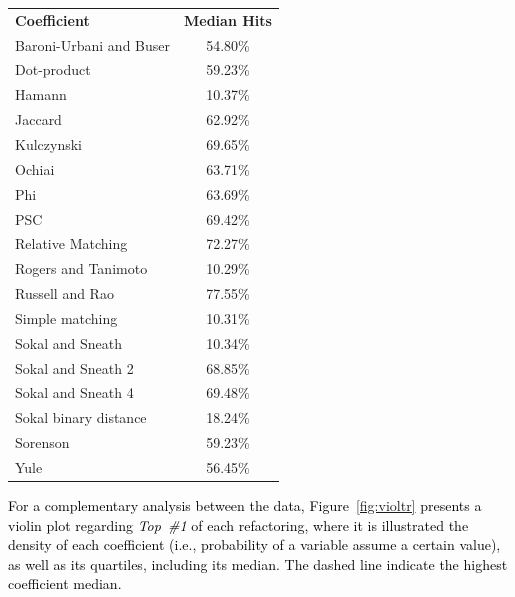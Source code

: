 \documentclass[smallextended,natbib]{svjour3}
\begin{document}
{\begin{table}[tbp]
\begin{tabular}{lccc}
    \hline
    \rowcolor{gray!25} \textbf{Coefficient}  & \multicolumn{3}{c}{\textbf{Median Hits}} \\
    Baroni-Urbani and Buser & \multicolumn{3}{c}{54.80\%} \\[-0.0110cm]
    \rowcolor{gray!15}Dot-product & \multicolumn{3}{c}{59.23\%} \\[-0.0110cm]
    Hamann & \multicolumn{3}{c}{10.37\%} \\[-0.0110cm]
    \rowcolor{gray!15}Jaccard & \multicolumn{3}{c}{62.92\%} \\[-0.0110cm]
    Kulczynski & \multicolumn{3}{c}{69.65\%} \\[-0.0110cm]
    \rowcolor{gray!15}Ochiai & \multicolumn{3}{c}{63.71\%} \\[-0.0110cm]
    Phi & \multicolumn{3}{c}{63.69\%} \\[-0.0110cm]
    \rowcolor{gray!15}PSC & \multicolumn{3}{c}{69.42\%} \\[-0.0110cm]
    Relative Matching & \multicolumn{3}{c}{72.27\%} \\[-0.0110cm]
    \rowcolor{gray!15}Rogers and Tanimoto & \multicolumn{3}{c}{10.29\%} \\[-0.0110cm]
    \rowcolor{mycolor}Russell and Rao & \multicolumn{3}{c}{77.55\%} \\[-0.0110cm]
    \rowcolor{gray!15}Simple matching & \multicolumn{3}{c}{10.31\%} \\[-0.0110cm]
    Sokal and Sneath & \multicolumn{3}{c}{10.34\%} \\[-0.0110cm]
    \rowcolor{gray!15}Sokal and Sneath 2 & \multicolumn{3}{c}{68.85\%} \\[-0.0110cm]
    Sokal and Sneath 4 & \multicolumn{3}{c}{69.48\%} \\[-0.0110cm]
    \rowcolor{gray!15}Sokal binary distance & \multicolumn{3}{c}{18.24\%} \\[-0.0110cm]
    Sorenson & \multicolumn{3}{c}{59.23\%} \\[-0.0110cm]
    \rowcolor{gray!15}Yule & \multicolumn{3}{c}{56.45\%} \\[-0.0110cm]
    \hline
    \end{tabular}%
  \label{tab:anal1}%
\end{table}%

\textcolor{black}{For a complementary analysis between the data, Figure~\ref{fig:violtr} presents a violin plot regarding \textit{Top~\#1} of each refactoring, where it is illustrated the density of each coefficient (i.e., probability of a variable assume a certain value), as well as its quartiles, including its median. The dashed line indicate the highest coefficient median.}

}
\end{document}
